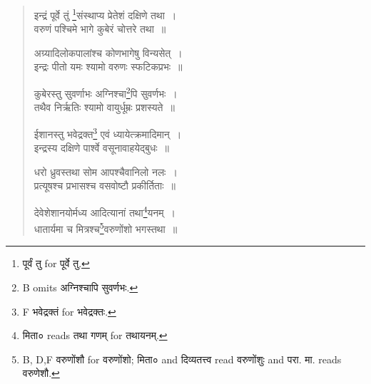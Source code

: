 \documentclass[11pt, openany]{book}
\begin{document}
\begin{quote}
{\vy इन्द्रं पूर्वे तुं \renewcommand{\thefootnote}{3}\footnote{पूर्वं तु for पूर्वे तु.}संस्थाप्य प्रेतेशं दक्षिणे तथा~।\\
वरुणं पश्चिमे भागे कुबेरं चोत्तरे तथा~॥

अग्र्यादिलोकपालांश्च कोणभागेषु विन्यसेत्~।\\
इन्द्रः पीतो यमः श्यामो वरुणः स्फटिकप्रभः~॥

कुबेरस्तु सुवर्णाभः अग्निश्चा\renewcommand{\thefootnote}{4}\footnote{B omits अग्निश्चापि सुवर्णभः.}पि सुवर्णभः~।\\
तथैव निर्ऋतिः श्यामो वायुर्धूम्रः प्रशस्यते~॥

ईशानस्तु भवेद्रक्त\renewcommand{\thefootnote}{5}\footnote{F भवेद्रक्तं for भवेद्रक्तः.} एवं ध्यायेत्क्रमादिमान्~।\\
इन्द्रस्य दक्षिणे पार्श्वे वसूनावाहयेद्बुधः~॥

धरो ध्रुवस्तथा सोम आपश्चैवानिलो नलः~।\\
प्रत्यूषश्च प्रभासश्च वसवोष्टौ प्रकीर्तिताः~॥

देवेशेशानयोर्मध्य आदित्यानां तथा\renewcommand{\thefootnote}{6}\footnote{मिता० reads तथा गणम् for तथायनम्.}यनम्~।\\
धातार्यमा च मित्रश्च\renewcommand{\thefootnote}{7}\footnote{B, D,F वरुणोंशौ for वरुणोंशो; मिता० and दिव्यतत्त्व read वरुणोंशुः and परा. मा. reads वरुणेशौ.}वरुणोंशो भगस्तथा~॥}
\end{quote}

\newpage
{}
\end{document}
